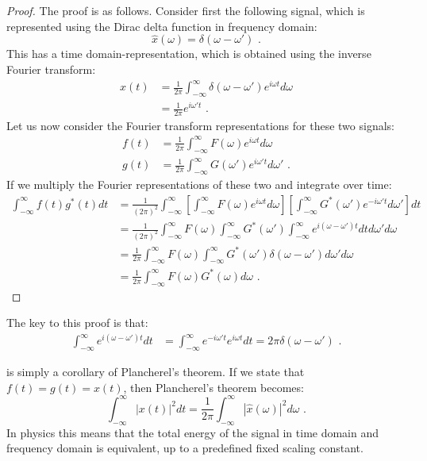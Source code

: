 \begin{proof}
The proof is as follows. Consider first the following signal, which is represented using the Dirac delta function in frequency domain:
\begin{equation}
\hat{x}(\omega) = \delta(\omega-\omega')\,\,.
\end{equation}
This has a time domain-representation, which is obtained using the inverse Fourier transform:
\begin{align}
x(t) &= \frac{1}{2\pi} \int_{-\infty}^{\infty} \delta(\omega-\omega')e^{i\omega t}d\omega \\
     &= \frac{1}{2\pi} e^{i\omega' t}\,\,.
\end{align}
Let us now consider the Fourier transform representations for these two signals:
\begin{align}
f(t) &= \frac{1}{2\pi} \int_{-\infty}^{\infty} F(\omega) e^{i\omega t}d\omega \\
g(t) &= \frac{1}{2\pi} \int_{-\infty}^{\infty} G(\omega') e^{i\omega' t}d\omega'\,\,.
\end{align}
If we multiply the Fourier representations of these two and integrate over time:
\begin{align}
\int_{-\infty}^{\infty} f(t)g^*(t)dt &= \frac{1}{(2\pi)^2} \int_{-\infty}^{\infty}  \left[\int_{-\infty}^{\infty} F(\omega) e^{i\omega t}d\omega \right] \left[ \int_{-\infty}^{\infty} G^*(\omega') e^{-i\omega' t}d\omega' \right]dt\\
&= \frac{1}{(2\pi)^2} \int_{-\infty}^{\infty} F(\omega) \int_{-\infty}^{\infty} G^*(\omega') \int_{-\infty}^{\infty} e^{i(\omega-\omega')t}dt d\omega' d\omega\\
&=\frac{1}{2\pi} \int_{-\infty}^{\infty} F(\omega) \int_{-\infty}^{\infty} G^*(\omega') \delta(\omega-\omega') d\omega' d\omega \\
&=\frac{1}{2\pi} \int_{-\infty}^{\infty} F(\omega) G^*(\omega)  d\omega \,\,.
\end{align}
\end{proof}
The key to this proof is that:
\begin{align}
\int_{-\infty}^{\infty} e^{i(\omega-\omega')t}dt &= \int_{-\infty}^{\infty} e^{-i\omega' t} e^{i\omega t} dt = 2\pi \delta(\omega - \omega')\,\,.
\end{align}


 is simply a corollary of Plancherel's theorem. If we state that $f(t)=g(t)=x(t)$, then Plancherel's theorem becomes:
\begin{equation}
\boxed{
\int_{-\infty}^{\infty} |x(t)|^2 dt = \frac{1}{2\pi} \int_{-\infty}^{\infty} | \hat{x}(\omega)|^2 d\omega\,\,.
}
\end{equation}
In physics this means that the total energy of the signal in time domain and frequency domain is equivalent, up to a predefined fixed scaling constant. 


